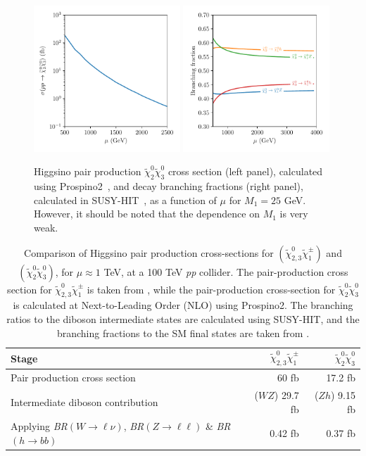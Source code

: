 \documentclass[a4paper,11pt]{article}
\newcommand{\N}{\widetilde{\chi}^0}
\newcommand{\C}{\widetilde{\chi}^\pm}
\begin{document}
\begin{figure}[h]
  \centering
  \includegraphics[width=0.49\textwidth]{images/xsection_plot.pdf}
  \includegraphics[width=0.49\textwidth]{images/br_plot.pdf}
  \caption{Higgsino pair production $\N_2\N_3$
    cross section (left panel), calculated using
    Prospino2~\cite{Beenakker:1999xh},  and decay branching fractions
    (right panel), calculated in SUSY-HIT~\cite{Djouadi:2006bz},  as a function
    of $\mu$ for $M_1=25$ GeV. However, it should be noted that the dependence
    on $M_1$ is very weak.
}
  \label{fig:xsection_plot}
\end{figure}

\begin{table}
  \centering
  \begin{tabular}{l|rr}
    \toprule
    Stage & $\N_{2,3}\C_1$ & $\N_2\N_3$\\
    \midrule
    Pair production cross section & 60 fb & 17.2 fb\\
    Intermediate diboson contribution & ($WZ$) 29.7 fb  & ($Zh$) 9.15 fb \\
    Applying \emph{BR}$(W\rightarrow \ell\nu)$, \emph{BR}$(Z\rightarrow \ell\ell)$ \& \emph{BR}$(h\rightarrow bb)$ & 0.42 fb & 0.37 fb\\
    \bottomrule
  \end{tabular}
  \caption{Comparison of Higgsino pair production cross-sections for
    $(\N_{2,3}\C_1)$ and
    $(\N_{2}\N_{3})$, for $\mu\approx 1$ TeV, at a 100
    TeV \emph{pp} collider. 
    The pair-production cross section for $\N_{2,3}\C_1$ is taken from
    \cite{Gori:2014oua}, while the pair-production cross-section for $\N_2\N_3$
    is calculated at Next-to-Leading Order (NLO) using Prospino2. The branching
    ratios to the diboson intermediate states are calculated using SUSY-HIT,
    and the branching fractions to the SM final states are taken from
    \cite{Olive:2016xmw}.}
  \label{tab:xsections}
\end{table}
\end{document}

